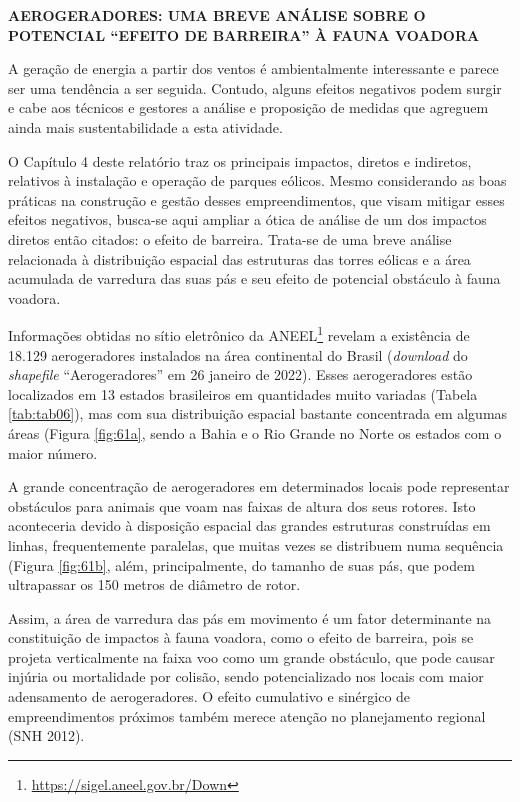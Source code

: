 \documentclass[
  oneside]{scrbook}
\DeclareRobustCommand{\href}[2]{#2\footnote{\url{#1}}}
\begin{document}
\begin{blackbox}

\begin{center}
\textbf{AEROGERADORES: UMA BREVE ANÁLISE SOBRE O POTENCIAL ``EFEITO DE BARREIRA'' À FAUNA VOADORA}

\end{center}

A geração de energia a partir dos ventos é ambientalmente interessante e parece ser uma tendência a ser seguida. Contudo, alguns efeitos negativos podem surgir e cabe aos técnicos e gestores a análise e proposição de medidas que agreguem ainda mais sustentabilidade a esta atividade.

O Capítulo 4 deste relatório traz os principais impactos, diretos e indiretos, relativos à instalação e operação de parques eólicos. Mesmo considerando as boas práticas na construção e gestão desses empreendimentos, que visam mitigar esses efeitos negativos, busca-se aqui ampliar a ótica de análise de um dos impactos diretos então citados: o efeito de barreira. Trata-se de uma breve análise relacionada à distribuição espacial das estruturas das torres eólicas e a área acumulada de varredura das suas pás e seu efeito de potencial obstáculo à fauna voadora.

Informações obtidas no \href{https://sigel.aneel.gov.br/Down}{sítio eletrônico da ANEEL} revelam a existência de 18.129 aerogeradores instalados na área continental do Brasil (\emph{download} do \emph{shapefile} ``Aerogeradores'' em 26 janeiro de 2022). Esses aerogeradores estão localizados em 13 estados brasileiros em quantidades muito variadas (Tabela \ref{tab:tab06}), mas com sua distribuição espacial bastante concentrada em algumas áreas (Figura \ref{fig:61a}, sendo a Bahia e o Rio Grande no Norte os estados com o maior número.

A grande concentração de aerogeradores em determinados locais pode representar obstáculos para animais que voam nas faixas de altura dos seus rotores. Isto aconteceria devido à disposição espacial das grandes estruturas construídas em linhas, frequentemente paralelas, que muitas vezes se distribuem numa sequência (Figura \ref{fig:61b}, além, principalmente, do tamanho de suas pás, que podem ultrapassar os 150 metros de diâmetro de rotor.

Assim, a área de varredura das pás em movimento é um fator determinante na constituição de impactos à fauna voadora, como o efeito de barreira, pois se projeta verticalmente na faixa voo como um grande obstáculo, que pode causar injúria ou mortalidade por colisão, sendo potencializado nos locais com maior adensamento de aerogeradores. O efeito cumulativo e sinérgico de empreendimentos próximos também merece atenção no planejamento regional (SNH 2012).

\end{blackbox}
\end{document}
